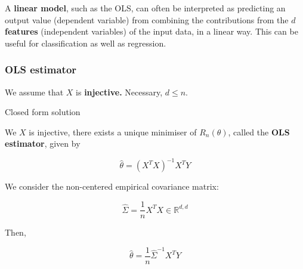 \documentclass[
10pt, %
a4paper, %
oneside, %
headinclude,footinclude, %
BCOR5mm, %
]{scrartcl}
\begin{document}
\begin{remark}
    A \textbf{{linear model}}, such as the OLS, can often be interpreted as
    predicting an output value (dependent variable) from combining the contributions from the $d$
    \textbf{{features}} (independent variables) of the input data, in a linear
    way. This can be useful for classification as well as regression.
\end{remark}

\subsubsection{\large\color{Periwinkle}OLS estimator}

We assume that $X$ is \textbf{{injective.}}  Necessary, $d\leq n$.

\begin{proposition}{Closed form solution}
    
    We $X$ is injective, there exists a unique minimiser of $R_n(\theta)$, called the \textbf{{OLS estimator}}, given by

    \begin{equation}
	\label{def:ols}
	\hat{ \theta}= (X^TX)^{-1}X^TY
    \end{equation}
\end{proposition}

\begin{remark}

    We consider the non-centered empirical covariance matrix:

    \begin{equation}
	\label{eq:Sigma}
	\hat{\Sigma} = \frac{1}{n} X^TX\in \mathbb{R}^{d, d}
    \end{equation}

    Then,

    \begin{equation}
	\hat{\theta} = \frac{1}{n} \hat{\Sigma}^{-1} X^TY
    \end{equation}
    
\end{remark}
\end{document}
